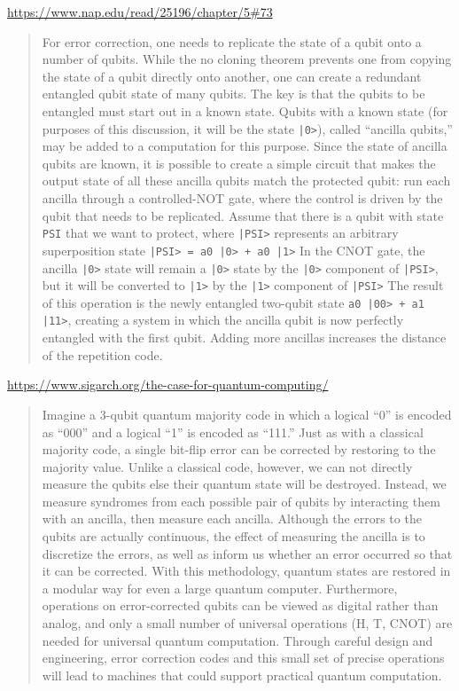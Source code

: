 \documentclass[sigplan,10pt,review,anonymous]{acmart}
\begin{document}
\url{https://www.nap.edu/read/25196/chapter/5#73}
\begin{quote}
  For error correction, one needs to replicate the state of a qubit
  onto a number of qubits. While the no cloning theorem prevents one
  from copying the state of a qubit directly onto another, one can
  create a redundant entangled qubit state of many qubits. The key is
  that the qubits to be entangled must start out in a known
  state. Qubits with a known state (for purposes of this discussion,
  it will be the state \verb.|0>.), called ``ancilla qubits,'' may be
  added to a computation for this purpose. Since the state of ancilla
  qubits are known, it is possible to create a simple circuit that
  makes the output state of all these ancilla qubits match the
  protected qubit: run each ancilla through a controlled-NOT gate,
  where the control is driven by the qubit that needs to be
  replicated. Assume that there is a qubit with state \verb.PSI. that
  we want to protect, where \verb.|PSI>. represents an arbitrary
  superposition state \verb.|PSI> = a0 |0> + a0 |1>. In the CNOT gate,
  the ancilla \verb.|0>. state will remain a \verb.|0>. state by the
  \verb.|0>. component of \verb.|PSI>., but it will be converted to
  \verb.|1>. by the \verb.|1>. component of \verb.|PSI>. The result of
  this operation is the newly entangled two-qubit state
  \verb.a0 |00> + a1 |11>., creating a system in which the ancilla
  qubit is now perfectly entangled with the first qubit. Adding more
  ancillas increases the distance of the repetition code.  \end{quote}

\url{https://www.sigarch.org/the-case-for-quantum-computing/}
\begin{quote}
  Imagine a 3-qubit quantum majority code in which a logical “0” is
  encoded as “000” and a logical “1” is encoded as “111.”  Just as
  with a classical majority code, a single bit-flip error can be
  corrected by restoring to the majority value.  Unlike a classical
  code, however, we can not directly measure the qubits else their
  quantum state will be destroyed.  Instead, we measure syndromes from
  each possible pair of qubits by interacting them with an ancilla,
  then measure each ancilla.  Although the errors to the qubits are
  actually continuous, the effect of measuring the ancilla is to
  discretize the errors, as well as inform us whether an error
  occurred so that it can be corrected.  With this methodology,
  quantum states are restored in a modular way for even a large
  quantum computer.  Furthermore, operations on error-corrected qubits
  can be viewed as digital rather than analog, and only a small number
  of universal operations (H, T, CNOT) are needed for universal
  quantum computation.  Through careful design and engineering, error
  correction codes and this small set of precise operations will lead
  to machines that could support practical quantum computation.
\end{quote}
\end{document}
